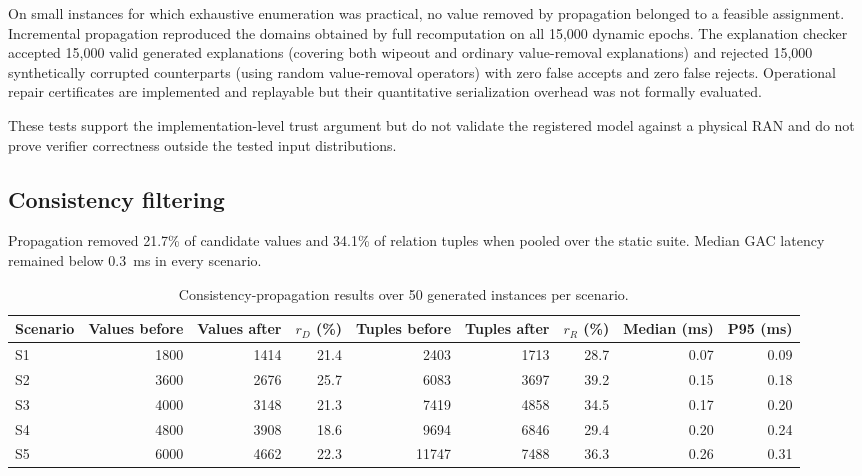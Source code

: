 \documentclass[pdflatex,sn-mathphys-num,iicol,oneside]{sn-jnl}
\newcommand{\gac}{\textsc{GAC}\xspace}
\begin{document}
On small instances for which exhaustive enumeration was practical, no
value removed by propagation belonged to a feasible assignment.
Incremental propagation reproduced the domains obtained by full
recomputation on all 15{,}000 dynamic epochs. The explanation checker
accepted 15{,}000 valid generated explanations (covering both wipeout and ordinary value-removal explanations) and rejected 15{,}000 synthetically corrupted counterparts (using random value-removal operators) with zero false accepts and zero false rejects. Operational repair certificates are implemented and replayable but their quantitative serialization overhead was not formally evaluated.

These tests support the implementation-level trust argument but do
not validate the registered model against a physical RAN and do not
prove verifier correctness outside the tested input distributions.

\subsection{Consistency filtering}

Propagation removed 21.7\% of candidate values and 34.1\% of relation
tuples when pooled over the static suite. Median \gac latency remained
below 0.3~ms in every scenario.

\begin{table}[t]
\centering
\caption{
Consistency-propagation results over 50 generated instances per
scenario.
}
\label{tab:propagation-results}
\setlength{\tabcolsep}{3.5pt}
\small

\begin{tabular}{lrrrrrrrr}
\toprule
Scenario &
Values before &
Values after &
$r_D$ (\%) &
Tuples before &
Tuples after &
$r_R$ (\%) &
Median (ms) &
P95 (ms)\\
\midrule

S1 & 1800 & 1414 & 21.4 & 2403 & 1713 & 28.7 & 0.07 & 0.09\\
S2 & 3600 & 2676 & 25.7 & 6083 & 3697 & 39.2 & 0.15 & 0.18\\
S3 & 4000 & 3148 & 21.3 & 7419 & 4858 & 34.5 & 0.17 & 0.20\\
S4 & 4800 & 3908 & 18.6 & 9694 & 6846 & 29.4 & 0.20 & 0.24\\
S5 & 6000 & 4662 & 22.3 & 11747 & 7488 & 36.3 & 0.26 & 0.31\\

\bottomrule
\end{tabular}
\normalsize
\end{table}
\end{document}
